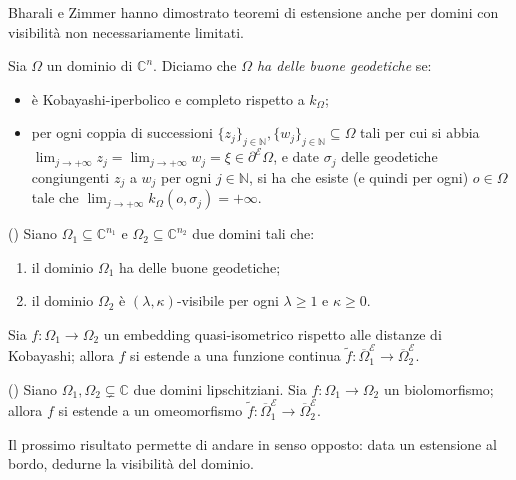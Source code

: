 Bharali e Zimmer hanno dimostrato teoremi di estensione anche per domini con visibilità non necessariamente limitati.

\begin{defn}
    Sia $\Omega$ un dominio di $\mathbb{C}^n$. Diciamo che \textit{$\Omega$ ha delle buone geodetiche} se:
    \begin{itemize}
        \item è Kobayashi-iperbolico e completo rispetto a $k_\Omega$;
        \item per ogni coppia di successioni $\{z_j\}_{j\in\mathbb{N}},\{w_j\}_{j\in\mathbb{N}}\subseteq\Omega$ tali per cui si abbia $\displaystyle\lim_{j\longrightarrow+\infty}z_j=\displaystyle\lim_{j\longrightarrow+\infty}w_j=\xi\in\partial^\mathcal{E}\Omega$, e date $\sigma_j$ delle geodetiche congiungenti $z_j$ a $w_j$ per ogni $j\in\mathbb{N}$, si ha che esiste (e quindi per ogni) $o\in\Omega$ tale che $\displaystyle\lim_{j\longrightarrow+\infty}k_\Omega(o,\sigma_j)=+\infty$.
    \end{itemize}
\end{defn}

\begin{thm}
    (\cite[Theorem 1.6]{BZ2}) Siano $\Omega_1\subseteq\mathbb{C}^{n_1}$ e $\Omega_2\subseteq\mathbb{C}^{n_2}$ due domini tali che:
    \begin{enumerate}[label={(\arabic*)}]
        \item il dominio $\Omega_1$ ha delle buone geodetiche;
        \item il dominio $\Omega_2$ è $(\lambda,\kappa)$-visibile per ogni $\lambda\ge 1$ e $\kappa\ge 0$.
    \end{enumerate}

    Sia $f:\Omega_1\longrightarrow\Omega_2$ un embedding quasi-isometrico rispetto alle distanze di Kobayashi; allora $f$ si estende a una funzione continua $\tilde{f}:\overline{\Omega}_1^\mathcal{E}\longrightarrow\overline{\Omega}_2^\mathcal{E}$.
\end{thm}

\begin{thm} \label{citchemiserveprima}
    (\cite[Theorem 1.9]{BZ2}) Siano $\Omega_1,\Omega_2\subsetneq\mathbb{C}$ due domini lipschitziani. Sia $f:\Omega_1\longrightarrow\Omega_2$ un biolomorfismo; allora $f$ si estende a un omeomorfismo $\tilde{f}:\overline{\Omega}_1^\mathcal{E}\longrightarrow\overline{\Omega}_2^\mathcal{E}$.
\end{thm}

Il prossimo risultato permette di andare in senso opposto: data un estensione al bordo, dedurne la visibilità del dominio.

